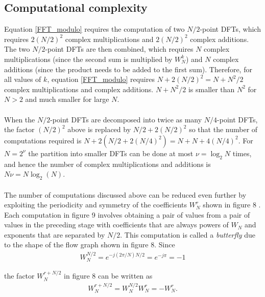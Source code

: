 \subsection{Computational complexity}
Equation \eqref{FFT_modulo} requires the computation of two $N/2$-point DFTs, which requires $2(N/2)^2$ complex multiplications and $2(N/2)^2$ complex additions. The two $N/2$-point DFTs are then combined, which requires $N$ complex multiplications (since the second sum is multiplied by $W_N^k$) and $N$ complex additions (since the product needs to be added to the first sum). Therefore, for all values of $k$, equation \eqref{FFT_modulo} requires $N + 2(N/2)^2 = N + N^2/2$ complex multiplications and complex additions. $N + N^2/2$ is smaller than $N^2$ for $N > 2$ and much smaller for large $N$.
\\\\
When the $N/2$-point DFTs are decomposed into twice as many $N/4$-point DFTs, the factor $(N/2)^2$ above is replaced by $N/2 + 2(N/2)^2$ so that the number of computations required is $N + 2(N/2+2(N/4)^2) = N + N + 4(N/4)^2$. For $N = 2^\nu$ the partition into smaller DFTs can be done at most $\nu = \log_2 N$ times, and hence the number of complex multiplications and additions is $N \nu = N \log_2 (N)$.
\\ \\
The number of computations discussed above can be reduced even further by exploiting the periodicity and symmetry of the coefficients $W_N^r$ shown in figure 8 \cite{DTSP}. Each computation in figure 9 involves obtaining a pair of values from a pair of values in the preceding stage with coefficients that are always powers of $W_N$ and exponents that are separated by $N/2$. This computation is called a \textit{butterfly} due to the shape of the flow graph shown in figure 8. Since 
\begin{align*}
W_N^{N/2} = e^{-j(2\pi/N)N/2} = e^{-j\pi} = -1
\end{align*}

the factor $W_N^{r+N/2}$ in figure 8 can be written as
\begin{align*}
W_N^{r+N/2} = W_N^{N/2} W_N^r = -W_N^r.
\end{align*}

